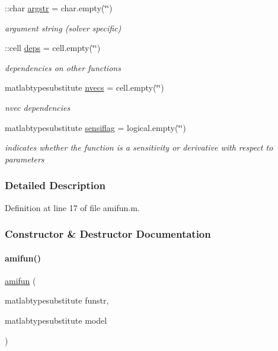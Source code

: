 \begin{DoxyCompactItemize}
\+::char \mbox{\hyperlink{classamifun_aa3914760f4131288b95f0f23d0fdfa6d}{argstr}} = char.\+empty(\char`\"{}\char`\"{})
\begin{DoxyCompactList}\small\item\em argument string (solver specific) \end{DoxyCompactList}\item 
\+::cell \mbox{\hyperlink{classamifun_a69ffe5c24686ceb79ed44399e6be556c}{deps}} = cell.\+empty(\char`\"{}\char`\"{})
\begin{DoxyCompactList}\small\item\em dependencies on other functions \end{DoxyCompactList}\item 
matlabtypesubstitute \mbox{\hyperlink{classamifun_a019d960f3d1c1c819a7f3fc90f952c4b}{nvecs}} = cell.\+empty(\char`\"{}\char`\"{})
\begin{DoxyCompactList}\small\item\em nvec dependencies \end{DoxyCompactList}\item 
matlabtypesubstitute \mbox{\hyperlink{classamifun_ad8930a02bca1d5facc6203b722d5349d}{sensiflag}} = logical.\+empty(\char`\"{}\char`\"{})
\begin{DoxyCompactList}\small\item\em indicates whether the function is a sensitivity or derivative with respect to parameters \end{DoxyCompactList}\end{DoxyCompactItemize}


\subsubsection{Detailed Description}


Definition at line 17 of file amifun.\+m.



\subsubsection{Constructor \& Destructor Documentation}
\mbox{\label{classamifun_a609e744c18813bc24f360b8cc5150344}} 
\paragraph{\texorpdfstring{amifun()}{amifun()}}
{\footnotesize\ttfamily \mbox{\hyperlink{classamifun}{amifun}} (\begin{DoxyParamCaption}\item[{matlabtypesubstitute}]{funstr,  }\item[{matlabtypesubstitute}]{model }\end{DoxyParamCaption})}


